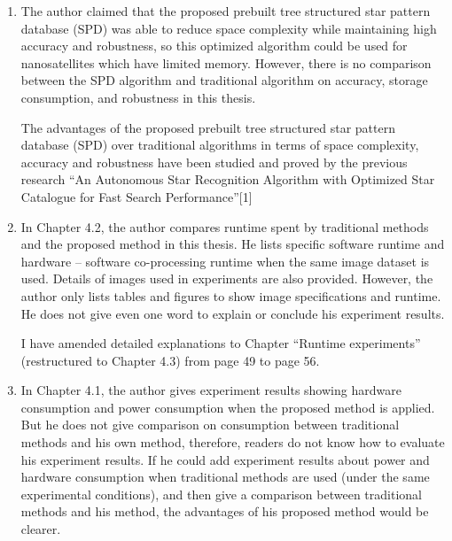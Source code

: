 \documentclass[dvips,a4paper,12pt]{report}
\begin{document}
\begin{enumerate}
    \color{blue}
    \item The author claimed that the proposed prebuilt tree structured star pattern database (SPD) was able to reduce space complexity while maintaining high accuracy and robustness, so this optimized algorithm could be used for nanosatellites which have limited memory. However, there is no comparison between the SPD algorithm and traditional algorithm on accuracy, storage consumption, and robustness in this thesis.

    \color{black}
    The advantages of the proposed prebuilt tree structured star pattern database (SPD) over traditional algorithms in terms of space complexity, accuracy and robustness have been studied and proved by the previous research ``An Autonomous Star Recognition Algorithm with Optimized Star Catalogue for Fast Search Performance''[1]

    \color{blue}
    \item In Chapter 4.2, the author compares runtime spent by traditional methods and the proposed method in this thesis. He lists specific software runtime and hardware – software co-processing runtime when the same image dataset is used. Details of images used in experiments are also provided. However, the author only lists tables and figures to show image specifications and runtime. He does not give even one word to explain or conclude his experiment results.

    \color{black}
    I have amended detailed explanations to Chapter ``Runtime experiments'' (restructured to Chapter 4.3) from page 49 to page 56.

    \color{blue}
    \item In Chapter 4.1, the author gives experiment results showing hardware consumption and power consumption when the proposed method is applied. But he does not give comparison on consumption between traditional methods and his own method, therefore, readers do not know how to evaluate his experiment results. If he could add experiment results about power and hardware consumption when traditional methods are used (under the same experimental conditions), and then give a comparison between traditional methods and his method, the advantages of his proposed method would be clearer.


\end{enumerate}
\end{document}
